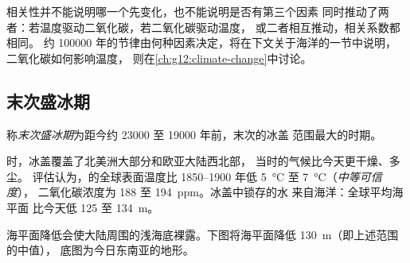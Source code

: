 相关性并不能说明哪一个先变化，也不能说明是否有第三个因素
同时推动了两者：若温度驱动二氧化碳，若二氧化碳驱动温度，
或二者相互推动，相关系数都相同。
约 \num{100000} 年的节律由何种因素决定，将在下文关于海洋的一节中说明，
二氧化碳如何影响温度，
则在\cref{ch:g12:climate-change}中讨论。

\subsection{末次盛冰期}

\begin{definition}[末次盛冰期]\label{def:g12:past-climates:lgm}
称\emph{末次盛冰期}为距今约
\num{23000} 至 \num{19000} 年前，末次的冰盖
范围最大的时期。
\end{definition}

时，冰盖覆盖了北美洲大部分和欧亚大陆西北部，
当时的气候比今天更干燥、多尘。
评估认为，的全球表面温度比 1850--1900 年低 \qty{5}{\degreeCelsius}
至 \qty{7}{\degreeCelsius}（\emph{中等可信度}），
二氧化碳浓度为 188 至 \qty{194}{ppm}。冰盖中锁存的水
来自海洋：全球平均海平面
比今天低 125 至 \qty{134}{m}。

海平面降低会使大陆周围的浅海底裸露。下图将海平面降低
\qty{130}{m}（即上述范围的中值），
底图为今日东南亚的地形。

